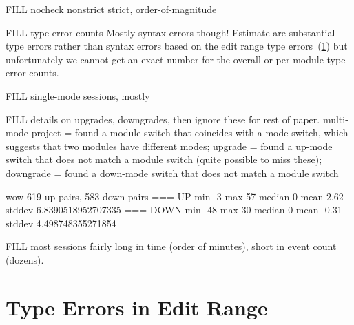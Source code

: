 \documentclass[english,submission,cleveref]{programming}
\begin{document}

FILL nocheck nonstrict strict, order-of-magnitude

FILL type error counts
Mostly syntax errors though!
Estimate  are substantial type errors rather than syntax
errors based on the edit range type errors~(\cref{s:type-error-count})
but unfortunately we cannot get an exact number for the overall
or per-module type error counts.

FILL single-mode sessions, mostly

FILL details on upgrades, downgrades, then ignore these for rest of paper.
multi-mode project = found a module switch that coincides with a mode switch, which suggests that two modules have different modes;
upgrade = found a up-mode switch that does not match a module switch (quite possible to miss these);
downgrade = found a down-mode switch that does not match a module switch

wow 619 up-pairs, 583 down-pairs
=== UP
min -3 max 57 median 0 mean 2.62 stddev 6.8390518952707335
=== DOWN
min -48 max 30 median 0 mean -0.31 stddev 4.498748355271854


FILL most sessions fairly long in time (order of minutes),
short in event count (dozens).


\section{Type Errors in Edit Range}
\label{s:type-error-count}
\end{document}
